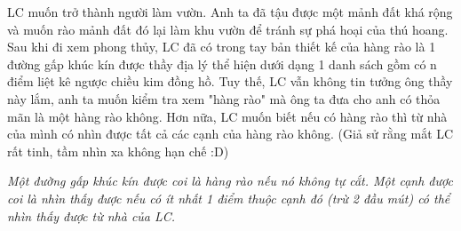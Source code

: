 LC muốn trở thành người làm vườn. Anh ta đã tậu được một mảnh đất khá rộng và muốn rào mảnh đất đó lại làm khu vườn để tránh sự phá hoại của thú hoang. Sau khi đi xem phong thủy, LC đã có trong tay bản thiết kế của hàng rào là 1 đường gấp khúc kín được thầy địa lý thể hiện dưới dạng 1 danh sách gồm có n điểm liệt kê ngược chiều kim đồng hồ. Tuy thế, LC vẫn không tin tưởng ông thầy này lắm, anh ta muốn kiểm tra xem "hàng rào" mà ông ta đưa cho anh có thỏa mãn là một hàng rào không. Hơn nữa, LC muốn biết nếu có hàng rào thì từ nhà của mình có nhìn được tất cả các cạnh của hàng rào không. (Giả sử rằng mắt LC rất tinh, tầm nhìn xa không hạn chế :D)  

\emph{    Một đường gấp khúc kín được coi là hàng rào nếu nó không tự cắt. Một cạnh được coi là nhìn thấy được nếu có ít nhất 1 điểm thuộc cạnh đó (trừ 2 đầu mút) có thể nhìn thấy được từ nhà của LC.   }

\